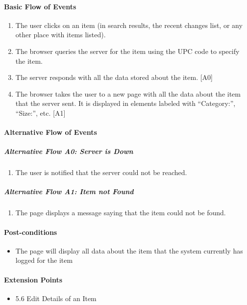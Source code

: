 \documentclass{article}
\begin{document}
\paragraph{Basic Flow of Events}
\begin{enumerate}
\item The user clicks on an item (in search results, the recent changes list, or any other place with items listed).
\item The browser queries the server for the item using the UPC code to specify the item.
\item The server responds with all the data stored about the item. [A0]
\item The browser takes the user to a new page with all the data about the item that the server sent.  It is displayed in elements labeled with ``Category:'', ``Size:'', etc. [A1]
\end{enumerate}

\paragraph{Alternative Flow of Events}

\subparagraph{Alternative Flow A0: Server is Down}
\begin{enumerate}
\item The user is notified that the server could not be reached.
\end{enumerate}

\subparagraph{Alternative Flow A1: Item not Found}
\begin{enumerate}
\item The page displays a message saying that the item could not be found.
\end{enumerate}

\paragraph{Post-conditions}
\begin{itemize}
\item The page will display all data about the item that the system currently has logged for the item
\end{itemize}

\paragraph{Extension Points}
\begin{itemize}
\item 5.6 Edit Details of an Item
\end{itemize}
\end{document}
